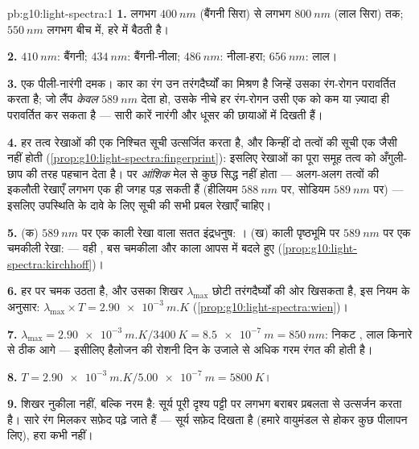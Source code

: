 \begin{solution}{pb:g10:light-spectra:1}
\textbf{1.} लगभग $\qty{400}{nm}$ (बैंगनी सिरा) से लगभग $\qty{800}{nm}$ (लाल सिरा) तक;
$\qty{550}{nm}$ लगभग बीच में, हरे में बैठती है।

\textbf{2.} $\qty{410}{nm}$: बैंगनी; $\qty{434}{nm}$: बैंगनी-नीला; $\qty{486}{nm}$: नीला-हरा;
$\qty{656}{nm}$: लाल।

\textbf{3.} एक  पीली-नारंगी दमक। कार का रंग उन
तरंगदैर्घ्यों का मिश्रण है जिन्हें उसका रंग-रोगन परावर्तित
करता है; जो लैंप \emph{केवल} $\qty{589}{nm}$ देता हो, उसके नीचे हर रंग-रोगन उसी
एक  को कम या ज़्यादा ही परावर्तित कर सकता है ---
सारी कारें नारंगी और धूसर की छायाओं में दिखती हैं।

\textbf{4.} हर तत्व रेखाओं की एक निश्चित सूची उत्सर्जित करता है, और
किन्हीं दो तत्वों की सूची एक जैसी नहीं होती (\cref{prop:g10:light-spectra:fingerprint}): इसलिए रेखाओं का
पूरा समूह तत्व को अँगुली-छाप की तरह पहचान देता है। पर \emph{आंशिक} मेल
से कुछ सिद्ध नहीं होता --- अलग-अलग तत्वों की इकलौती रेखाएँ लगभग एक ही
जगह पड़ सकती हैं (हीलियम $\qty{588}{nm}$ पर, सोडियम $\qty{589}{nm}$ पर) --- इसलिए
उपस्थिति के दावे के लिए सूची की सभी प्रबल रेखाएँ चाहिए।

\textbf{5.} (क) $\qty{589}{nm}$ पर एक काली रेखा वाला सतत इंद्रधनुष:
। (ख) काली पृष्ठभूमि पर $\qty{589}{nm}$ पर एक चमकीली
रेखा:  --- वही , बस
चमकीला और काला आपस में बदले हुए (\cref{prop:g10:light-spectra:kirchhoff})।

\textbf{6.}  हर  पर चमक उठता है,
और उसका शिखर $\lambda_{\max}$ छोटी तरंगदैर्घ्यों की ओर खिसकता है, इस
नियम के अनुसार:
$\lambda_{\max} \times T = \qty{2.90e-3}{m.K}$
(\cref{prop:g10:light-spectra:wien})।

\textbf{7.} $\lambda_{\max} = \qty{2.90e-3}{m.K} / \qty{3400}{K}
= \qty{8.5e-7}{m} = \qty{850}{nm}$: निकट , लाल किनारे से ठीक आगे ---
इसीलिए हैलोजन की रोशनी दिन के उजाले से अधिक गरम रंगत की होती है।

\textbf{8.} $T = \qty{2.90e-3}{m.K} / \qty{5.00e-7}{m} = \qty{5800}{K}$।

\textbf{9.} शिखर नुकीला नहीं, बल्कि नरम है: सूर्य पूरी दृश्य पट्टी पर
लगभग बराबर प्रबलता से उत्सर्जन करता है। सारे रंग मिलकर सफ़ेद पढ़े जाते
हैं --- सूर्य सफ़ेद दिखता है (हमारे वायुमंडल से होकर कुछ पीलापन लिए),
हरा कभी नहीं।


\end{solution}
